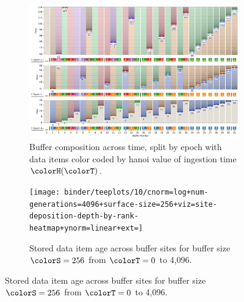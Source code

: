 \begin{figure}[h!]
  \centering

\begin{subfigure}[b]{\linewidth}
\includegraphics[width=\linewidth]{
binder/teeplots/10/num-generations=128+reservation-mode=steady+surface-size=32+viz=site-reservation-by-rank-spliced-at-heatmap+ext=}
\vspace{-4ex}\caption{
  Buffer composition across time, split by epoch with data items color coded by hanoi value of ingestion time $\colorH(\colorT)$.
}
\label{fig:hsurf-steady-implementation-schematic}
\end{subfigure}

\vspace{1ex}\begin{minipage}[]{\textwidth}
 \vspace{-2pt}
  \begin{subfigure}[t]{0.7\linewidth}
    \vspace{0pt}
    \centering
  \texttt{[image: binder/teeplots/10/cnorm=log+num-generations=4096+surface-size=256+viz=site-deposition-depth-by-rank-heatmap+ynorm=linear+ext=]}
  \end{subfigure}%
  \begin{subfigure}[t]{0.3\linewidth}
  \vspace{-2pt}
  \caption{%
    Stored data item age across buffer sites for buffer size $\colorS=256$ from $\colorT=0$ to 4,096.
  }
  \label{fig:hsurf-steady-implementation-heatmap}
\end{subfigure}
\end{minipage}


\end{figure}
